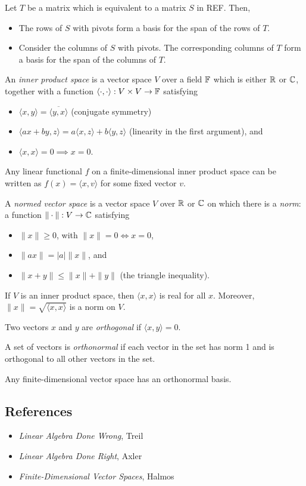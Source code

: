 \begin{prop}
  Let $T$ be a matrix which is equivalent to a matrix $S$ in REF\@. Then,
  \begin{itemize}
    \item The rows of $S$ with pivots form a basis for the span of the rows of $T$.
    \item Consider the columns of $S$ with pivots. The corresponding columns of
      $T$ form a basis for the span of the columns of $T$.
  \end{itemize}
\end{prop}
\begin{defn}
  An \emph{inner product space} is a vector space $V$ over a field $\mathbb{F}$ which
  is either $\mathbb{R}$ or $\mathbb{C}$, together with a function
  $\langle\cdot,\cdot\rangle:V\times V\to\mathbb{F}$ satisfying
  \begin{itemize}
    \item $\langle  x, y\rangle=\overline{\langle 
      y, x\rangle}$ (conjugate
      symmetry)
    \item $\langle a x+b y, z\rangle=a\langle
      x, z\rangle+b\langle y, z\rangle$ (linearity in the
      first argument), and
    \item $\langle x, x\rangle=0\implies x= 0$.
  \end{itemize}
\end{defn}
\begin{prop}
  Any linear functional $f$ on a finite-dimensional inner product space can be
  written as $f(x)=\langle x,v\rangle$ for some fixed vector $v$.
\end{prop}
\begin{defn}
  A \emph{normed vector space} is a vector space $V$ over $\mathbb{R}$ or $\mathbb{C}$
  on which there is a \emph{norm}: a function $\|\cdot\|:V\to\mathbb{C}$ satisfying
  \begin{itemize}
    \item $\| x\|\ge 0$, with $\|x\|=0\iff x=0$,
    \item $\|a x\|=|a|\| x\|$, and
    \item $\| x+ y\|\le\| x\|+\| y\|$ (the triangle
      inequality).
  \end{itemize}
\end{defn}
\begin{prop}
  If $V$ is an inner product space, then $\langle x, x\rangle$ is
  real for all $ x$.
  Moreover, $\| x\|=\sqrt{\langle x, x\rangle}$ is a norm
  on $V$.
\end{prop}
\begin{defn}
  Two vectors $ x$ and $ y$ are \emph{orthogonal} if $\langle
   x, y\rangle=0$.

  A set of vectors is \emph{orthonormal} if each vector in the set has norm 1
  and is orthogonal to all other vectors in the set.
\end{defn}
\begin{prop}
  Any finite-dimensional vector space has an orthonormal basis.
\end{prop}

\subsection*{References}
\begin{itemize}
  \item \emph{Linear Algebra Done Wrong}, Treil
  \item \emph{Linear Algebra Done Right}, Axler
  \item \emph{Finite-Dimensional Vector Spaces}, Halmos
\end{itemize}
